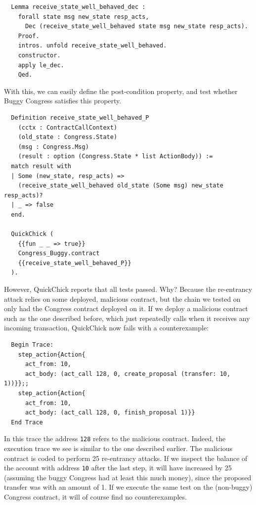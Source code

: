 \documentclass[twoside,11pt,openright]{report}
\newenvironment{code}{\captionsetup{type=figure, singlelinecheck=off, justification=raggedleft}}{}
\newcommand{\coq}[1]{\texttt{#1}}
\begin{document}
\begin{code}
\label{def:receive_state_well_behaved_dec}
\begin{verbatim}
  Lemma receive_state_well_behaved_dec :
    forall state msg new_state resp_acts,
      Dec (receive_state_well_behaved state msg new_state resp_acts).
    Proof.
    intros. unfold receive_state_well_behaved. 
    constructor. 
    apply le_dec.
    Qed.
\end{verbatim}
\end{code}
With this, we can easily define the post-condition property, and test whether Buggy Congress satisfies this property.
\begin{code}
\label{def:receive_state_well_behaved_P}
\begin{verbatim}
  Definition receive_state_well_behaved_P 
    (cctx : ContractCallContext) 
    (old_state : Congress.State) 
    (msg : Congress.Msg) 
    (result : option (Congress.State * list ActionBody)) := 
  match result with
  | Some (new_state, resp_acts) =>
    (receive_state_well_behaved old_state (Some msg) new_state resp_acts)?
  | _ => false
  end.

  QuickChick (
    {{fun _ _ => true}}
    Congress_Buggy.contract
    {{receive_state_well_behaved_P}}
  ).
\end{verbatim}
\end{code}
However, QuickChick reports that all tests passed. Why? Because the re-entrancy attack relies on some deployed, malicious contract, but the chain we tested on only had the Congress contract deployed on it. If we deploy a malicious contract such as the one described before, which just repeatedly calls \finishproposal{} when it receives any incoming transaction, QuickChick now fails with a counterexample:
\begin{code}
\begin{verbatim}
  Begin Trace: 
    step_action{Action{
      act_from: 10, 
      act_body: (act_call 128, 0, create_proposal (transfer: 10, 1))}};;
    step_action{Action{
      act_from: 10, 
      act_body: (act_call 128, 0, finish_proposal 1)}}
  End Trace
\end{verbatim}
\end{code}
In this trace the address \coq{128} refers to the malicious contract. Indeed, the execution trace we see is similar to the one described earlier. The malicious contract is coded to perform 25 re-entrancy attacks. If we inspect the balance of the account with address \coq{10} after the last step, it will have increased by 25 (assuming the buggy Congress had at least this much money), since the proposed transfer was with an amount of 1. If we execute the same test on the (non-buggy) Congress contract, it will of course find no counterexamples.
\end{document}
